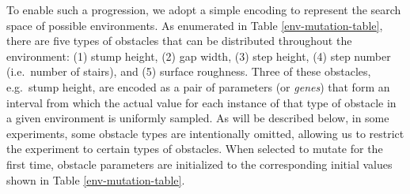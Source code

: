 \documentclass{article}
\newcommand{\jc}[1]{\comments{\textcolor{deepForestGreen}{[JC: #1]}}}
\newcommand{\jl}[1]{\comments{\textcolor{magenta}{[Joel: #1]}}}
\newcommand{\ks}[1]{\comments{\textcolor{purple}{[Ken: #1]}}}
\newcommand{\rw}[1]{\comments{\textcolor{blue}{[Rui: #1]}}}
\newcommand{\comments}[1]{#1}
\begin{document}
To enable such a progression, we adopt a simple encoding 
to represent the search space of possible environments. 
As enumerated in Table \ref{env-mutation-table}, there are five types of obstacles that can be distributed throughout the environment: (1) stump height, (2) gap width, (3) step height, (4) step number (i.e.\ number of stairs), and (5) surface roughness. 
Three of these obstacles, e.g.\ stump height, are encoded as a pair of parameters (or \emph{genes}) that form an interval from which the actual value for each instance of that type of obstacle in a given environment is uniformly sampled.  As will be described below, in some experiments, some obstacle types are intentionally omitted, allowing us to restrict the experiment to certain types of obstacles. 
When selected to mutate for the first time, obstacle parameters are initialized to the corresponding initial values shown in Table \ref{env-mutation-table}. 
\end{document}
